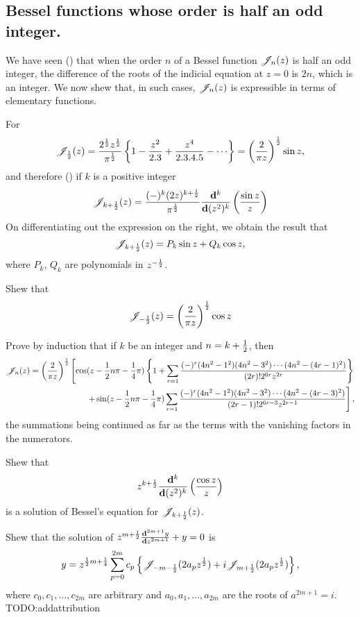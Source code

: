\documentclass{book}
\begin{document}
\subsection{Bessel functions whose order is half an odd integer.}
We have seen () that when the order $n$ of a
Bessel function $\mathscr{J}_n(z)$ is half an odd integer, the difference of the
roots of the indicial equation at $z=0$ is $2n$, which is an integer.
We now shew that, in such cases, $\mathscr{J}_n(z)$ is expressible in terms of
elementary functions.

For 
$$
\besJ_{\half}(z) 
= 
\frac{2^{\half} z^{\half}}{\pi^{\half}}
\thebrace{ 1
  - \frac{z^2}{2.3}
  + \frac{z^4}{2.3.4.5}
  - \cdots
}
= \theparen{ \frac{2}{\pi z}  }^{\half}
\sin z,
$$
and therefore () if $k$ is a
positive integer
$$
\mathscr{J}_{k+\frac{1}{2}}(z)
=
\frac{(-)^k (2z)^{k+\frac{1}{2}}}{\pi^{\frac{1}{2}}}
\frac{\mathbf{d}^k}{\mathbf{d} (z^2)^k}
\left(  \frac{\sin z}{z}   \right)
$$
On differentiating out the expression on the right, we obtain the
result that
$$
\mathscr{J}_{k+\frac{1}{2}}(z) = P_k \sin z + Q_k \cos z,
$$
where $P_k$, $Q_k$ are polynomials in $z^{-\frac{1}{2}}$.
\begin{wandwexample}
  Shew that
  $$
  \mathscr{J}_{-\frac{1}{2}}(z) = \left(  \frac{2}{\pi z} \right)^{\frac{1}{2}} \cos z
  $$
\end{wandwexample}
% 
% 
\begin{wandwexample}
  Prove by induction that if $k$ be an integer and $n = k + \frac{1}{2}$,
  then
  \begin{align*}
    \mathscr{J}_n(z)
    =
    \left( \frac{2}{\pi z} \right)^{\frac{1}{2}}
    \left[
      \cos(z - \frac{1}{2} n \pi - \frac{1}{4}\pi)
      \left\{ 
        1
        +
        \sum_{r=1}
        \frac{(-)^r (4n^2-1^2)(4n^2-3^2)\cdots(4n^2-(4r-1)^2)}{(2r)! 2^{6r} z^{2r}}
       \right\}
    \right.
    \\
    \left.
      +
      \sin(z - \frac{1}{2} n \pi - \frac{1}{4}\pi)
      \sum_{r=1}
      \frac{(-)^r (4n^2-1^2)(4n^2-3^2)\cdots(4n^2-(4r-3)^2)}{(2r-1)!
        2^{6r-3} z^{2r-1}}
    \right],
  \end{align*}
  the summations being continued as far as the terms with the
  vanishing factors in the numerators.
\end{wandwexample}
\begin{wandwexample}
  Shew that
  $$
  z^{k+\frac{1}{2}} \frac{\mathbf{d}^k}{\mathbf{d} (z^2)^k} \left( \frac{\cos z}{z} \right)
  $$
  is a solution of Bessel's equation for $\mathscr{J}_{k+\frac{1}{2}}(z)$.
\end{wandwexample}
\begin{wandwexample}
  Shew that the solution of
  $
  z^{m+\frac{1}{2}} \frac{\mathbf{d}^{2m+1} y}{\mathbf{d} z^{2m+1}} + y = 0
  $
  is
  $$
  y
  =
  z^{\frac{1}{2} m + \frac{1}{4}}
  \sum_{p=0}^{2m}
  c_p
  \left\{  \mathscr{J}_{-m-\frac{1}{2}}(2a_pz^{\frac{1}{2}}) + i\mathscr{J}_{m+\frac{1}{2}}(2a_pz^{\frac{1}{2}}) \right\},
  $$
  where
  $c_0,c_1,\ldots,c_{2m}$ are arbitrary and
  $a_0,a_1,\ldots,a_{2m}$ are the roots of
  $a^{2m+1}=i$. TODO:addattribution
\end{wandwexample}
\end{document}
